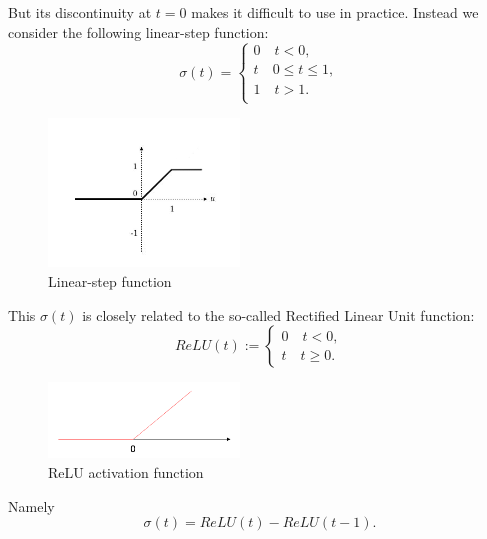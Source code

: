       But its discontinuity at $t=0$
      makes it difficult to use in practice. Instead we consider the
      following linear-step function:
  \begin{equation}\label{linear-step}
  \sigma(t)=
    \begin{cases}
       0 \quad t<0, \\
      t\quad 0\le t\le 1, \\
     1 \quad t> 1. \\
    \end{cases}
  \end{equation}
\begin{figure}
\centering
\includegraphics[width=2in]{./figures/zig}   
\caption{Linear-step function}
\end{figure}
This $\sigma(t)$ is closely related to the so-called Rectified Linear Unit function: 
\begin{equation}\label{ReLU}
ReLU(t):=\begin{cases}
0 \quad t< 0, \\
t \quad t\ge 0. 
\end{cases}
\end{equation}
\begin{figure}
\centering
\includegraphics[width=2in]{./figures/ReLU}   
\caption{ReLU activation function }
\end{figure}
Namely 
\begin{equation}
  \label{sigma-ReLU}
\sigma(t)=ReLU(t)-ReLU(t-1).
\end{equation}

